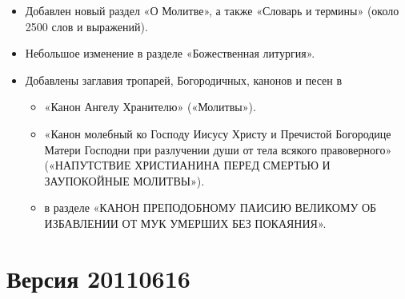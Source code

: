 \begin{itemize}

\item Добавлен новый раздел «О Молитве», а также «Словарь и термины» (около 2500 слов и выражений).

\item Небольшое изменение в разделе «Божественная литургия».

\item Добавлены заглавия тропарей, Богородичных, канонов и песен в

\begin{itemize}

\item «Канон Ангелу Хранителю» («Молитвы»).

\item «Канон молебный ко Господу Иисусу Христу и Пречистой Богородице Матери Господни при разлучении души от тела всякого правоверного» («НАПУТСТВИЕ ХРИСТИАНИНА ПЕРЕД СМЕРТЬЮ И ЗАУПОКОЙНЫЕ МОЛИТВЫ»).

\item в разделе «КАНОН ПРЕПОДОБНОМУ ПАИСИЮ ВЕЛИКОМУ ОБ ИЗБАВЛЕНИИ ОТ МУК УМЕРШИХ БЕЗ ПОКАЯНИЯ».

\end{itemize}
\end{itemize}

\section*{Версия 20110616}


